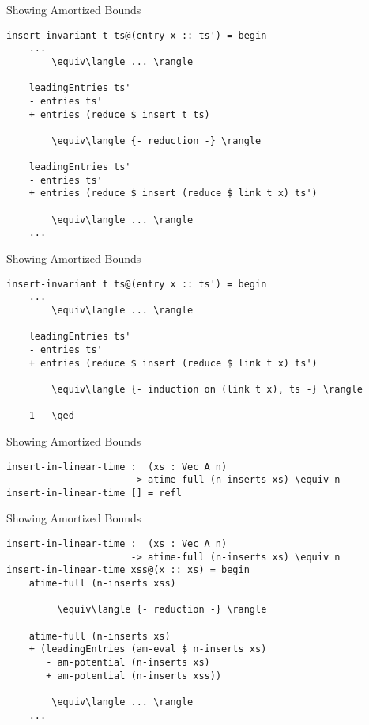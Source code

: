\documentclass[11pt]{beamer}
\begin{document}
    \begin{frame}[fragile]{Showing Amortized Bounds}
        \begin{lstlisting}[emph={insert,invariant}]
insert-invariant t ts@(entry x :: ts') = begin
    ...
        \equiv\langle ... \rangle

    leadingEntries ts'
    - entries ts'
    + entries (reduce $ insert t ts)

        \equiv\langle {- reduction -} \rangle

    leadingEntries ts'
    - entries ts'
    + entries (reduce $ insert (reduce $ link t x) ts')

        \equiv\langle ... \rangle
    ...
        \end{lstlisting}
    \end{frame}

    \begin{frame}[fragile]{Showing Amortized Bounds}
        \begin{lstlisting}[emph={insert,invariant}]
insert-invariant t ts@(entry x :: ts') = begin
    ...
        \equiv\langle ... \rangle

    leadingEntries ts'
    - entries ts'
    + entries (reduce $ insert (reduce $ link t x) ts')

        \equiv\langle {- induction on (link t x), ts -} \rangle

    1   \qed
        \end{lstlisting}
    \end{frame}

    \begin{frame}[fragile]{Showing Amortized Bounds}
        \begin{lstlisting}[emph={insert,in,linear,time}]
insert-in-linear-time :  (xs : Vec A n)
                      -> atime-full (n-inserts xs) \equiv n
insert-in-linear-time [] = refl
        \end{lstlisting}
    \end{frame}

    \begin{frame}[fragile]{Showing Amortized Bounds}
        \begin{lstlisting}[emph={insert,in,linear,time}]
insert-in-linear-time :  (xs : Vec A n)
                      -> atime-full (n-inserts xs) \equiv n
insert-in-linear-time xss@(x :: xs) = begin
    atime-full (n-inserts xss)

         \equiv\langle {- reduction -} \rangle

    atime-full (n-inserts xs)
    + (leadingEntries (am-eval $ n-inserts xs)
       - am-potential (n-inserts xs)
       + am-potential (n-inserts xss))

        \equiv\langle ... \rangle
    ...
        \end{lstlisting}
    \end{frame}
\end{document}
